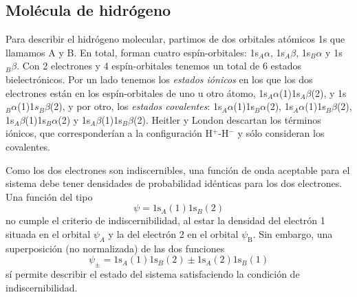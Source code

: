 \documentclass{tufte-handout}
\begin{document}
\subsection{Molécula de hidrógeno}
Para describir el hidrógeno molecular, partimos de dos orbitales atómicos 1s que llamamos A y B.
En total, forman cuatro espín-orbitales: 1s$_A\alpha$, 
1s$_A \beta$, 1s$_B\alpha$ y 1s$_B \beta$. 
Con 2 electrones y 4 espín-orbitales tenemos un total de 6 estados
bielectrónicos. Por un lado tenemos los \textit{estados 
iónicos} en los que los dos electrones  están en los
espín-orbitales de uno u otro átomo, 
1s$_A\alpha$(1)1s$_A\beta$(2),
y 1s$_B\alpha$(1)1$s_B\beta$(2), 
y por otro, los \textit{estados covalentes}:
1s$_A\alpha$(1)1s$_B\alpha$(2), 1s$_A\alpha$(1)1s$_B\beta$(2), 
1s$_A\beta$(1)1s$_B\alpha$(2) y 1s$_A\beta$(1)1s$_B\beta$(2).
Heitler y London descartan los términos iónicos, que 
corresponderían a la configuración H$^+$-H$^-$ y sólo 
consideran los covalentes.

Como los dos electrones son indiscernibles, una función de onda
aceptable para el sistema debe tener densidades de probabilidad 
idénticas para los dos electrones. Una función del tipo
\begin{equation}
    \psi=\mathrm{1s}_A(1)\mathrm{1s}_B(2)
\end{equation}
no cumple el criterio de indiscernibilidad, al estar la densidad
del electrón 1 situada en el orbital $\psi_A$ y la del electrón
2 en el orbital $\psi_\mathrm{B}$. Sin embargo, una
superposición (no normalizada) de las dos funciones 
\begin{equation}
    \psi_\pm=\mathrm{1s}_A(1)\mathrm{1s}_B(2) \pm
    \mathrm{1s}_A(2)\mathrm{1s}_B(1)
\end{equation}
sí permite describir el estado del sistema satisfaciendo la 
condición de indiscernibilidad. 
\end{document}
